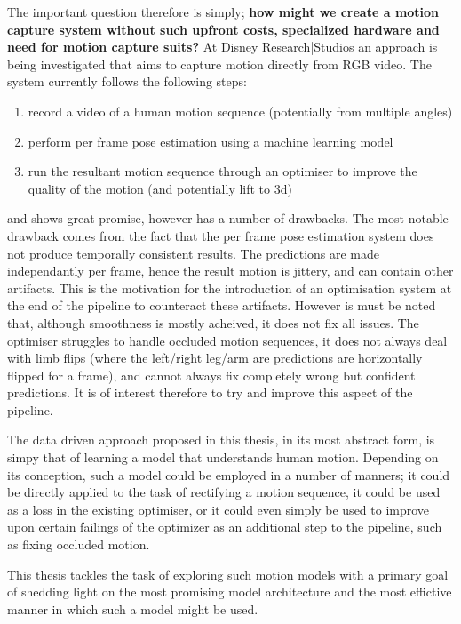 The important question therefore is simply; \textbf{how might we create a motion capture system without such upfront costs, specialized hardware and need for motion capture suits?}
At Disney Research|Studios an approach is being investigated that aims to capture motion directly from RGB video. The system currently follows the following steps:
\begin{enumerate}
    \item record a video of a human motion sequence (potentially from multiple angles)
    \item perform per frame pose estimation using a machine learning model
    \item run the resultant motion sequence through an optimiser to improve the quality of the motion (and potentially lift to 3d)
\end{enumerate}
and shows great promise, however has a number of drawbacks.
The most notable drawback comes from the fact that the per frame pose estimation system does not produce temporally consistent results. The predictions are made independantly per frame, hence the result motion is jittery, and can contain other artifacts. This is the motivation for the introduction of an optimisation system at the end of the pipeline to counteract these artifacts. However is must be noted that, although smoothness is mostly acheived, it does not fix all issues. The optimiser struggles to handle occluded motion sequences, it does not always deal with limb flips (where the left/right leg/arm are predictions are horizontally flipped for a frame), and cannot always fix completely wrong but confident predictions. It is of interest therefore to try and improve this aspect of the pipeline.

The data driven approach proposed in this thesis, in its most abstract form, is simpy that of learning a model that understands human motion. Depending on its conception, such a model could be employed in a number of manners; it could be directly applied to the task of rectifying a motion sequence, it could be used as a loss in the existing optimiser, or it could even simply be used to improve upon certain failings of the optimizer as an additional step to the pipeline, such as fixing occluded motion.

This thesis tackles the task of exploring such motion models with a primary goal of shedding light on the most promising model architecture and the most effictive manner in which such a model might be used.

